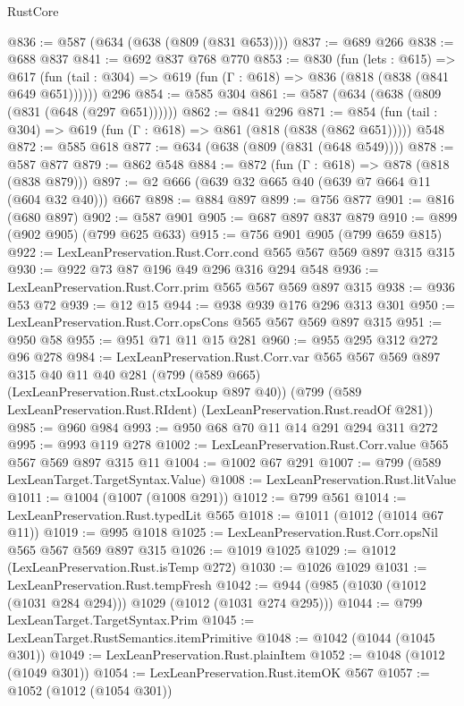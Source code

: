 \begin{lexlean}{RustCore}
\begin{coremodule}
@836 := @587 (@634 (@638 (@809 (@831 @653))))
@837 := @689 @266
@838 := @688 @837
@841 := @692 @837 @768 @770
@853 := @830
    (fun (lets : @615) =>
    @617 (fun (tail : @304) => @619 (fun (Γ : @618) => @836 (@818 (@838 (@841 @649 @651))))))
    @296
@854 := @585 @304
@861 := @587 (@634 (@638 (@809 (@831 (@648 (@297 @651))))))
@862 := @841 @296
@871 := @854 (fun (tail : @304) => @619 (fun (Γ : @618) => @861 (@818 (@838 (@862 @651))))) @548
@872 := @585 @618
@877 := @634 (@638 (@809 (@831 (@648 @549))))
@878 := @587 @877
@879 := @862 @548
@884 := @872 (fun (Γ : @618) => @878 (@818 (@838 @879)))
@897 := @2 @666 (@639 @32 @665 @40 (@639 @7 @664 @11 (@604 @32 @40))) @667
@898 := @884 @897
@899 := @756 @877
@901 := @816 (@680 @897)
@902 := @587 @901
@905 := @687 @897 @837 @879
@910 := @899 (@902 @905) (@799 @625 @633)
@915 := @756 @901 @905 (@799 @659 @815)
@922 := LexLeanPreservation.Rust.Corr.cond @565 @567 @569 @897 @315 @315
@930 := @922 @73 @87 @196 @49 @296 @316 @294 @548
@936 := LexLeanPreservation.Rust.Corr.prim @565 @567 @569 @897 @315
@938 := @936 @53 @72
@939 := @12 @15
@944 := @938 @939 @176 @296 @313 @301
@950 := LexLeanPreservation.Rust.Corr.opsCons @565 @567 @569 @897 @315
@951 := @950 @58
@955 := @951 @71 @11 @15 @281
@960 := @955 @295 @312 @272 @96 @278
@984 := LexLeanPreservation.Rust.Corr.var
    @565
    @567
    @569
    @897
    @315
    @40
    @11
    @40
    @281
    (@799 (@589 @665) (LexLeanPreservation.Rust.ctxLookup @897 @40))
    (@799 (@589 LexLeanPreservation.Rust.RIdent) (LexLeanPreservation.Rust.readOf @281))
@985 := @960 @984
@993 := @950 @68 @70 @11 @14 @291 @294 @311 @272
@995 := @993 @119 @278
@1002 := LexLeanPreservation.Rust.Corr.value @565 @567 @569 @897 @315 @11
@1004 := @1002 @67 @291
@1007 := @799 (@589 LexLeanTarget.TargetSyntax.Value)
@1008 := LexLeanPreservation.Rust.litValue
@1011 := @1004 (@1007 (@1008 @291))
@1012 := @799 @561
@1014 := LexLeanPreservation.Rust.typedLit @565
@1018 := @1011 (@1012 (@1014 @67 @11))
@1019 := @995 @1018
@1025 := LexLeanPreservation.Rust.Corr.opsNil @565 @567 @569 @897 @315
@1026 := @1019 @1025
@1029 := @1012 (LexLeanPreservation.Rust.isTemp @272)
@1030 := @1026 @1029
@1031 := LexLeanPreservation.Rust.tempFresh
@1042 := @944 (@985 (@1030 (@1012 (@1031 @284 @294))) @1029 (@1012 (@1031 @274 @295)))
@1044 := @799 LexLeanTarget.TargetSyntax.Prim
@1045 := LexLeanTarget.RustSemantics.itemPrimitive
@1048 := @1042 (@1044 (@1045 @301))
@1049 := LexLeanPreservation.Rust.plainItem
@1052 := @1048 (@1012 (@1049 @301))
@1054 := LexLeanPreservation.Rust.itemOK @567
@1057 := @1052 (@1012 (@1054 @301))

\end{coremodule}
\end{lexlean}
